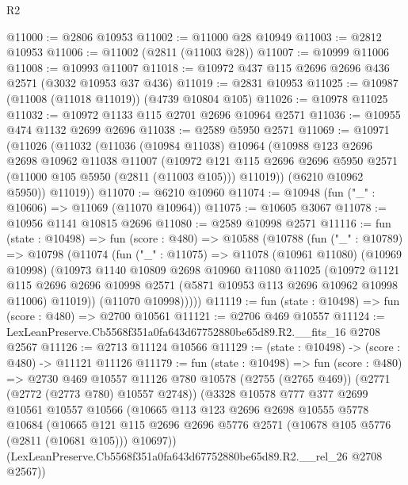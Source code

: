 \begin{lexlean}{R2}
\begin{coremodule}
@11000 := @2806 @10953
@11002 := @11000 @28 @10949
@11003 := @2812 @10953
@11006 := @11002 (@2811 (@11003 @28))
@11007 := @10999 @11006
@11008 := @10993 @11007
@11018 := @10972 @437 @115 @2696 @2696 @436 @2571 (@3032 @10953 @37 @436)
@11019 := @2831 @10953
@11025 := @10987 (@11008 (@11018 @11019)) (@4739 @10804 @105)
@11026 := @10978 @11025
@11032 := @10972 @1133 @115 @2701 @2696 @10964 @2571
@11036 := @10955 @474 @1132 @2699 @2696
@11038 := @2589 @5950 @2571
@11069 := @10971
    (@11026
      (@11032
        (@11036
          (@10984 @11038)
          @10964
          (@10988
            @123
            @2696
            @2698
            @10962
            @11038
            @11007
            (@10972
              @121
              @115
              @2696
              @2696
              @5950
              @2571
              (@11000 @105 @5950 (@2811 (@11003 @105)))
              @11019))
          (@6210 @10962 @5950))
        @11019))
@11070 := @6210 @10960
@11074 := @10948 (fun ("_" : @10606) => @11069 (@11070 @10964))
@11075 := @10605 @3067
@11078 := @10956 @1141 @10815 @2696
@11080 := @2589 @10998 @2571
@11116 := fun (state : @10498) =>
  fun (score : @480) =>
  @10588
    (@10788
      (fun ("_" : @10789) =>
      @10798
        (@11074
          (fun ("_" : @11075) =>
          @11078
            (@10961 @11080)
            (@10969 @10998)
            (@10973
              @1140
              @10809
              @2698
              @10960
              @11080
              @11025
              (@10972
                @1121
                @115
                @2696
                @2696
                @10998
                @2571
                (@5871 @10953 @113 @2696 @10962 @10998 @11006)
                @11019))
            (@11070 @10998)))))
@11119 := fun (state : @10498) => fun (score : @480) => @2700 @10561
@11121 := @2706 @469 @10557
@11124 := LexLeanPreserve.Cb5568f351a0fa643d67752880be65d89.R2.__fits_16 @2708 @2567
@11126 := @2713 @11124 @10566
@11129 := (state : @10498) -> (score : @480) -> @11121 @11126
@11179 := fun (state : @10498) =>
  fun (score : @480) =>
  @2730
    @469
    @10557
    @11126
    @780
    @10578
    (@2755 (@2765 @469))
    (@2771 (@2772 (@2773 @780) @10557 @2748))
    (@3328
      @10578
      @777
      @377
      @2699
      @10561
      @10557
      @10566
      (@10665
        @113
        @123
        @2696
        @2698
        @10555
        @5778
        @10684
        (@10665 @121 @115 @2696 @2696 @5776 @2571 (@10678 @105 @5776 (@2811 (@10681 @105))) @10697))
      (LexLeanPreserve.Cb5568f351a0fa643d67752880be65d89.R2.__rel_26 @2708 @2567))

\end{coremodule}
\end{lexlean}
